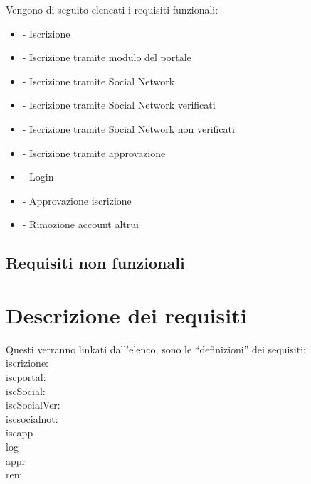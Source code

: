 \label{sub:requisiti_funzionali}
Vengono di seguito elencati i requisiti funzionali:
\begin{itemize} 
	\item {} - Iscrizione
	\item {} - Iscrizione tramite modulo del portale 
	\item {} - Iscrizione tramite Social Network
	\item {} - Iscrizione tramite Social Network verificati
	\item {} - Iscrizione tramite Social Network non verificati
	\item {} - Iscrizione tramite approvazione
	\item {} - Login 
	\countReset 
	\item {} - Approvazione iscrizione
	\item {} - Rimozione account altrui 
	\countReset

\end{itemize}	


\subsection{Requisiti non funzionali}
\label{sub:requisiti_non_funzionali}


\section{Descrizione dei requisiti}
\label{sec:descrizione_dei_requisiti}
Questi verranno linkati dall'elenco, sono le ``definizioni'' dei sequisiti:\\
iscrizione:   \\
iscportal:   \\
iscSocial:   \\
iscSocialVer:   \\
iscsocialnot:   \\
iscapp  \\
log  \\
appr  \\
rem  \\

